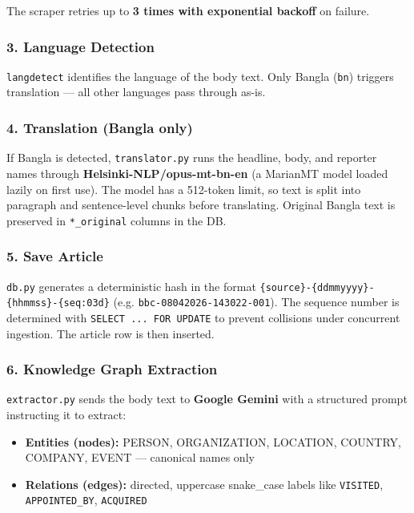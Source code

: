 \documentclass[
]{article}
\providecommand{\tightlist}{%
  \setlength{\itemsep}{0pt}\setlength{\parskip}{0pt}}
\begin{document}
The scraper retries up to \textbf{3 times with exponential backoff} on
failure.

\subsubsection{3. Language Detection}\label{3-language-detection}

\texttt{langdetect} identifies the language of the body text. Only
Bangla (\texttt{bn}) triggers translation --- all other languages pass
through as-is.

\subsubsection{4. Translation (Bangla
only)}\label{4-translation-bangla-only}

If Bangla is detected, \texttt{translator.py} runs the headline, body,
and reporter names through \textbf{Helsinki-NLP/opus-mt-bn-en} (a
MarianMT model loaded lazily on first use). The model has a 512-token
limit, so text is split into paragraph and sentence-level chunks before
translating. Original Bangla text is preserved in \texttt{*\_original}
columns in the DB.

\subsubsection{5. Save Article}\label{5-save-article}

\texttt{db.py} generates a deterministic hash in the format
\texttt{\{source\}-\{ddmmyyyy\}-\{hhmmss\}-\{seq:03d\}} (e.g.
\texttt{bbc-08042026-143022-001}). The sequence number is determined
with \texttt{SELECT\ ...\ FOR\ UPDATE} to prevent collisions under
concurrent ingestion. The article row is then inserted.

\subsubsection{6. Knowledge Graph
Extraction}\label{6-knowledge-graph-extraction}

\texttt{extractor.py} sends the body text to \textbf{Google Gemini} with
a structured prompt instructing it to extract:

\begin{itemize}
\tightlist
\item
  \textbf{Entities (nodes):} PERSON, ORGANIZATION, LOCATION, COUNTRY,
  COMPANY, EVENT --- canonical names only
\item
  \textbf{Relations (edges):} directed, uppercase snake\_case labels
  like \texttt{VISITED}, \texttt{APPOINTED\_BY}, \texttt{ACQUIRED}
\end{itemize}
\end{document}

